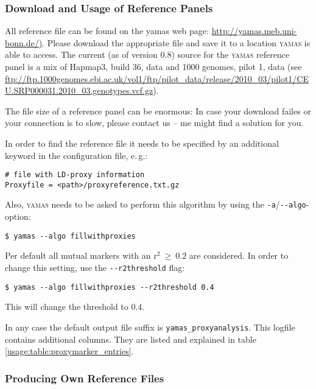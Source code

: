 \subsubsection{Download and Usage of Reference Panels}

All reference file can be found on the yamas web page:  \url{http://yamas.meb.uni-bonn.de/)}. Please download the appropriate file and save it to a location \textsc{yamas} is able to access. The current (as of version 0.8) source for the \textsc{yamas} reference panel is a mix of Hapmap3, build 36, data and 1000 genomes, pilot 1, data (see \url{ftp://ftp.1000genomes.ebi.ac.uk/vol1/ftp/pilot_data/release/2010_03/pilot1/CEU.SRP000031.2010_03.genotypes.vcf.gz}).

\alert{The file size of a reference panel can be enormous: In case your download failes or your connection is to slow, please contact us -- me might find a solution for you.}

In order to find the reference file it needs to be specified by an additional keyword in the configuration file, e.\,g.:
\begin{lstlisting}[style=Plain]
# file with LD-proxy information
Proxyfile = <path>/proxyreference.txt.gz
\end{lstlisting}

Also, \textsc{yamas} needs to be asked to perform this algorithm by using the \verb+-a+/\verb+--algo+-option:
\begin{lstlisting}[style=shell]
$ yamas --algo fillwithproxies
\end{lstlisting}

Per default all mutual markers with an r$^2~\geq~0.2$ are considered. In order to change this setting, use the \verb+--r2threshold+ flag:
\begin{lstlisting}[style=shell]
$ yamas --algo fillwithproxies --r2threshold 0.4
\end{lstlisting}
This will change the threshold to 0.4.

In any case the default output file suffix is \verb+yamas_proxyanalysis+. This logfile contains additional columns. They are listed and explained in table \ref{usage:table:proxymarker_entries}.


\subsubsection{Producing Own Reference Files}
\label{algo:own_refernce_files}

